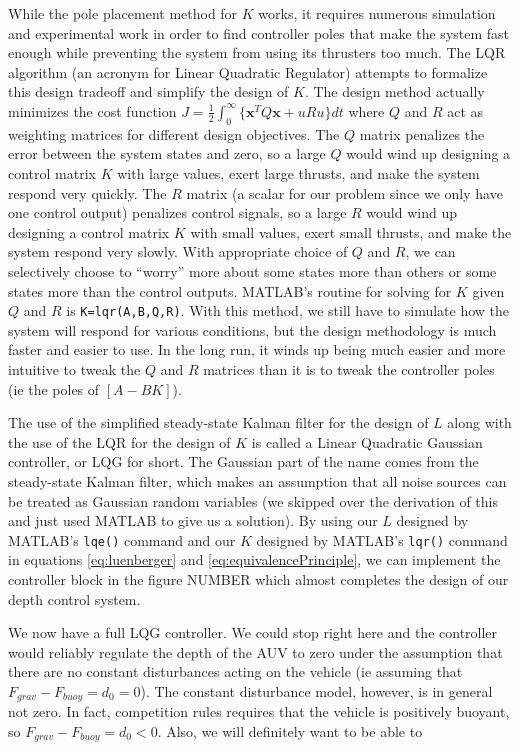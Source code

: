 \documentclass{article}
\begin{document}
While the pole placement method for $K$ works, it requires numerous simulation and experimental work in order to find controller poles that make the system fast enough while preventing the system from using its thrusters too much.  The LQR algorithm (an acronym for Linear Quadratic Regulator) attempts to formalize this design tradeoff and simplify the design of $K$.  The design method actually minimizes the cost function $J=\frac{1}{2}\int_{0}^{\infty}\{\pmb{x}^TQ\pmb{x}+uRu\}dt$ where $Q$ and $R$ act as weighting matrices for different design objectives.  The $Q$ matrix penalizes the error between the system states and zero, so a large $Q$ would wind up designing a control matrix $K$ with large values, exert large thrusts, and make the system respond very quickly.  The $R$ matrix (a scalar for our problem since we only have one control output) penalizes control signals, so a large $R$ would wind up designing a control matrix $K$ with small values, exert small thrusts, and make the system respond very slowly.  With appropriate choice of $Q$ and $R$, we can selectively choose to ``worry'' more about some states more than others or some states more than the control outputs.  MATLAB's routine for solving for $K$ given $Q$ and $R$ is \verb+K=lqr(A,B,Q,R)+.  With this method, we still have to simulate how the system will respond for various conditions, but the design methodology is much faster and easier to use.  In the long run, it winds up being much easier and more intuitive to tweak the $Q$ and $R$ matrices than it is to tweak the controller poles (ie the poles of $[A-BK]$).

The use of the simplified steady-state Kalman filter for the design of $L$ along with the use of the LQR for the design of $K$ is called a Linear Quadratic Gaussian controller, or LQG for short.  The Gaussian part of the name comes from the steady-state Kalman filter, which makes an assumption that all noise sources can be treated as Gaussian random variables (we skipped over the derivation of this and just used MATLAB to give us a solution).  By using our $L$ designed by MATLAB's \verb+lqe()+ command and our $K$ designed by MATLAB's \verb+lqr()+ command in equations \ref{eq:luenberger} and \ref{eq:equivalencePrinciple}, we can implement the controller block in the figure NUMBER which almost completes the design of our depth control system.


We now have a full LQG controller.  We could stop right here and the controller would reliably regulate the depth of the AUV to zero under the assumption that there are no constant disturbances acting on the vehicle (ie assuming that $F_{grav}-F_{buoy}=d_0=0$).  The constant disturbance model, however, is in general not zero.  In fact, competition rules requires that the vehicle is positively buoyant, so $F_{grav}-F_{buoy}=d_0<0$.  Also, we will definitely want to be able to 
\end{document}
